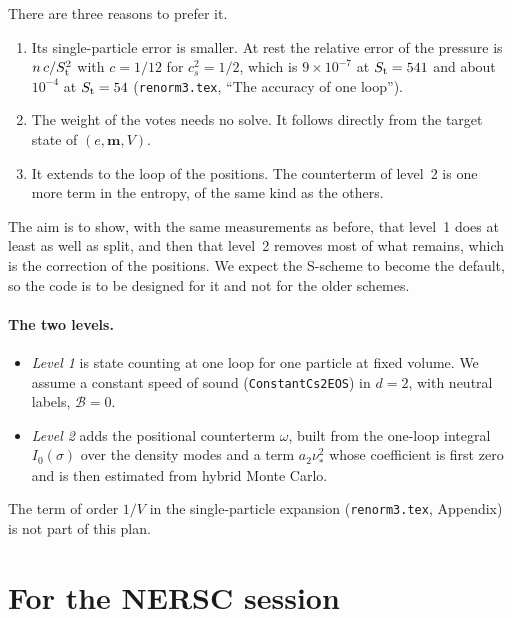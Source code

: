 \documentclass[11pt,aps,preprint,nofootinbib,superscriptaddress,tightenlines]{revtex4-2}
\let\oldparagraph\paragraph
\renewcommand{\paragraph}{\par\bigskip\oldparagraph}
\begin{document}
There are three reasons to prefer it.
\begin{enumerate}
\item Its single-particle error is smaller.  At rest the relative error of the pressure is $n\,c/S_{\rm t}^2$ with $c=1/12$ for $c_s^2=1/2$, which is
  $9\times10^{-7}$ at $S_{\rm t}=541$ and about $10^{-4}$ at $S_{\rm t}=54$ (\nolinkurl{renorm3.tex}, ``The accuracy of one loop'').
\item The weight of the votes needs no solve.  It follows directly from the target state of $(e,\bm m,V)$.
\item It extends to the loop of the positions.  The counterterm of level~2 is one more term in the entropy, of the same kind as the others.
\end{enumerate}
The aim is to show, with the same measurements as before, that level~1 does at least as well as split, and then that level~2 removes most of what
remains, which is the correction of the positions.  We expect the S-scheme to become the default, so the code is to be designed for it and not for
the older schemes.

\paragraph{The two levels.}
\begin{itemize}
\item \emph{Level 1} is state counting at one loop for one particle at fixed volume.  We assume a constant speed of sound (\texttt{ConstantCs2EOS}) in
  $d=2$, with neutral labels, $\mathcal B=0$.
\item \emph{Level 2} adds the positional counterterm $\omega$, built from the one-loop integral $I_0(\sigma)$ over the density modes and a term
  $a_2\nu_*^2$ whose coefficient is first zero and is then estimated from hybrid Monte Carlo.
\end{itemize}
The term of order $1/V$ in the single-particle expansion (\nolinkurl{renorm3.tex}, Appendix) is not part of this plan.

\section{For the NERSC session}
\label{sec:nersc}
\end{document}
